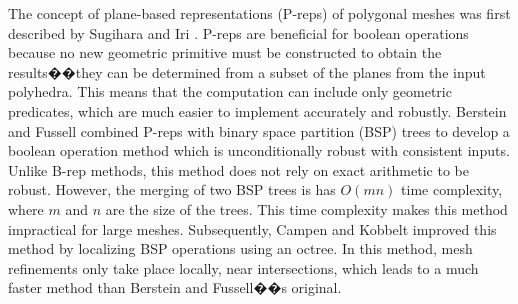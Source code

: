 The concept of plane-based representations (P-reps) of polygonal meshes was first described by Sugihara and Iri \cite{sugihara1990solid}. P-reps are beneficial for boolean operations because no new geometric primitive must be constructed to obtain the results��they can be determined from a subset of the planes from the input polyhedra. This means that the computation can include only geometric predicates, which are much easier to implement accurately and robustly. Berstein and Fussell \cite{bernstein2009fast} combined P-reps with binary space partition (BSP) trees \cite{thibault1987set,naylor1990merging} to develop a boolean operation method which is unconditionally robust with consistent inputs. Unlike B-rep methods, this method does not rely on exact arithmetic to be robust. However, the merging of two BSP trees is has $O(mn)$ time complexity, where $m$ and $n$ are the size of the trees. This time complexity makes this method impractical for large meshes. Subsequently, Campen and Kobbelt \cite{campen2010exact} improved this method by localizing BSP operations using an octree. In this method, mesh refinements only take place locally, near intersections, which leads to a much faster method than Berstein and Fussell��s original.
